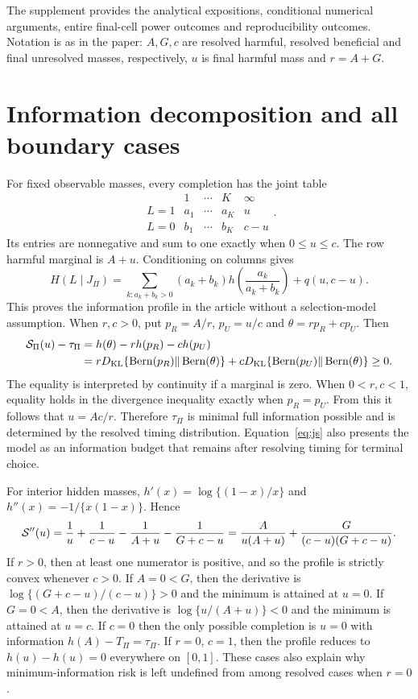 The supplement provides the analytical expositions, conditional numerical arguments, entire final-cell power outcomes and reproducibility outcomes. Notation is as in the paper: $A,G,c$ are resolved harmful, resolved beneficial and final unresolved masses, respectively, $u$ is final harmful mass and $r=A+G$.

\section{Information decomposition and all boundary cases}
For fixed observable masses, every completion has the joint table
\begin{equation}
 \begin{array}{c|cccc} &1&\cdots&K&\infty\\\hline
 L=1&a_1&\cdots&a_K&u\\
 L=0&b_1&\cdots&b_K&c-u
 \end{array}.
\end{equation}
Its entries are nonnegative and sum to one exactly when $0\le u\le c$. The row harmful marginal is $A+u$. Conditioning on columns gives
\begin{equation}
 H(L\mid J_\Pi)=\sum_{k:a_k+b_k>0}(a_k+b_k)h\left(\frac{a_k}{a_k+b_k}\right)+q(u,c-u).
\end{equation}
This proves the information profile in the article without a selection-model assumption. When $r,c>0$, put $p_R=A/r$, $p_U=u/c$ and $\theta=rp_R+cp_U$. Then
\begin{align}
 \mathcal S_\Pi(u)-\tau_\Pi
 &=h(\theta)-r h(p_R)-c h(p_U)\\
 &=rD_{\mathrm{KL}}\{\operatorname{Bern}(p_R)\Vert\operatorname{Bern}(\theta)\}
 +cD_{\mathrm{KL}}\{\operatorname{Bern}(p_U)\Vert\operatorname{Bern}(\theta)\}\ge0.\label{eq:js}
\end{align}
The equality is interpreted by continuity if a marginal is zero. When $0<r,c<1$, equality holds in the divergence inequality exactly when $p_R=p_U$. From this it follows that $u=Ac/r$. Therefore $\tau_\Pi$ is minimal full information possible and is determined by the resolved timing distribution. Equation~\eqref{eq:js} also presents the model as an information budget that remains after resolving timing for terminal choice.

For interior hidden masses, $h'(x)=\log\{(1-x)/x\}$ and $h''(x)=-1/\{x(1-x)\}$. Hence
\begin{equation}
 \mathcal S''(u)=\frac1u+\frac1{c-u}-\frac1{A+u}-\frac1{G+c-u}
 =\frac{A}{u(A+u)}+\frac{G}{(c-u)(G+c-u)}.
\end{equation}
If $r>0$, then at least one numerator is positive, and so the profile is strictly convex whenever $c>0$. If $A=0< G$, then the derivative is $\log\{(G+ c -u)/(c -u)\}>0$ and the minimum is attained at $u=0$. If $G=0< A$, then the derivative is $\log\{u/(A+u)\}<0$ and the minimum is attained at $u=c$. If $c=0$ then the only possible completion is $u=0$ with information $h(A)-T_\Pi=\tau_\Pi$. If $r=0$, $c=1$, then the profile reduces to $h(u)-h(u)=0$ everywhere on $[0,1]$. These cases also explain why minimum-information risk is left undefined from among resolved cases when $r=0$.

